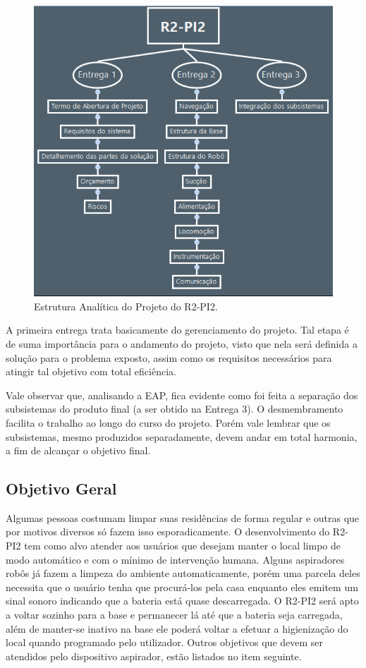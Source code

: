 	\begin{figure}[H]
		\centering
		\includegraphics[scale=0.55]{figuras/eap.png}
		\caption{Estrutura Analítica do Projeto do R2-PI2.}
		\label{img:eap}
	\end{figure}

	A primeira entrega trata basicamente do gerenciamento do projeto. Tal etapa é de suma importância para o andamento do projeto, visto que nela será definida a solução para o problema exposto, assim como os requisitos necessários para atingir tal objetivo com total eficiência.

	Vale observar que, analisando a EAP, fica evidente como foi feita a separação dos subsistemas do produto final (a ser obtido na Entrega 3). O desmembramento facilita o trabalho ao longo do curso do projeto. Porém vale lembrar que os subsistemas, mesmo produzidos separadamente, devem  andar em total harmonia, a fim de alcançar o objetivo final.

\subsection{Objetivo Geral} %
\label{sub:objetivo_geral}
	
	Algumas pessoas costumam limpar suas residências de forma regular e outras que por motivos diversos só fazem isso esporadicamente. O desenvolvimento do R2-PI2 tem como alvo atender aos usuários que desejam manter o local limpo de modo automático e com o mínimo de intervenção humana. Alguns aspiradores robôs já fazem a limpeza do ambiente automaticamente, porém uma parcela deles necessita que o usuário tenha que procurá-los pela casa enquanto eles emitem um sinal sonoro indicando que a bateria está quase descarregada. O R2-PI2 será apto a voltar sozinho para a base e permanecer lá até que a bateria seja carregada, além de manter-se inativo na base ele poderá voltar a efetuar a higienização do local quando programado pelo utilizador. Outros objetivos que devem ser atendidos pelo dispositivo aspirador, estão listados no item seguinte.

